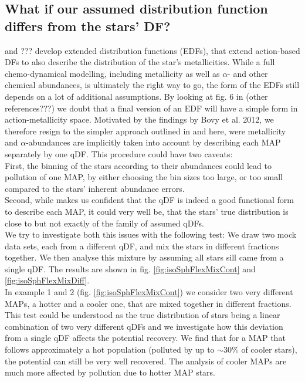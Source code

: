 \subsection{What if our assumed distribution function differs from the stars' DF?}

\cite{san15} and ??? develop extended distribution functions (EDFs), that extend action-based DFs to also describe the distribution of the star's metallicities. While a full chemo-dynamical modelling,  including metallicity as well as $\alpha$- and other chemical abundances, is ultimately the right way to go, the form of the EDFs still depends on a lot of additional assumptions. By looking at fig. 6 in \cite{bov13} (other references???) we doubt that a final version of an EDF will have a simple form in action-metallicity space. Motivated by the findings by Bovy et al. 2012, we therefore resign to the simpler approach outlined in \cite{bov13} and here, were metallicity and $\alpha$-abundances are implicitly taken into account by describing each MAP separately by one qDF. This procedure could have two caveats: 
\\First, the binning of the stars according to their abundances could lead to pollution of one MAP, by either choosing the bin sizes too large, or too small compared to the stars' inherent abundance errors. 
\\Second, while \citet{tin13} makes us confident that the qDF is indeed a good functional form to describe each MAP, it could very well be, that the stars' true distribution is close to but not exactly of the family of assumed qDFs. 
\\We try to investigate both this issues with the following test: We draw two mock data sets, each from a different qDF, and mix the stars in different fractions together. We then analyse this mixture by assuming all stars sill came from a single qDF. The results are shown in fig. \ref{fig:isoSphFlexMixCont} and \ref{fig:isoSphFlexMixDiff}. 
\\In example 1 and 2 (fig. \ref{fig:isoSphFlexMixCont}) we consider two very different MAPs, a hotter and a cooler one, that are mixed together in different fractions. This test could be understood as the true distribution of stars being a linear combination of two very different qDFs and we investigate how this deviation from a single qDF affects the potential recovery. We find that for a MAP that follows approximately a hot population (polluted by up to $\sim30\%$ of cooler stars), the potential can still be very well recovered. The analysis of cooler MAPs are much more affected by pollution due to hotter MAP stars.
